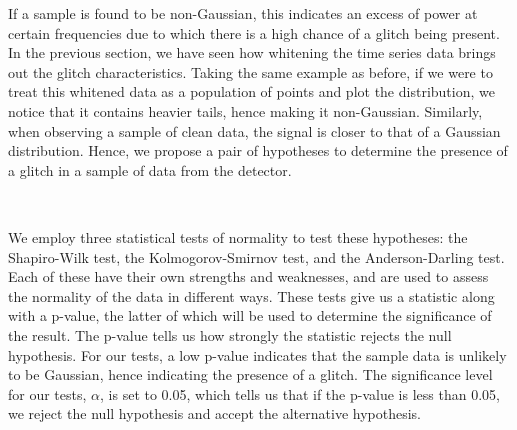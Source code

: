 \documentclass[12pt]{article}
\begin{document}
\medskip
\noindent If a sample is found to be non-Gaussian, this indicates an excess of power at certain frequencies due to which there is a high chance of a glitch being present. In the previous section, we have seen how whitening the time series data brings out the glitch characteristics. Taking the same example as before, if we were to treat this whitened data as a population of points and plot the distribution, we notice that it contains heavier tails, hence making it non-Gaussian. Similarly, when observing a sample of clean data, the signal is closer to that of a Gaussian distribution. Hence, we propose a pair of hypotheses to determine the presence of a glitch in a sample of data from the detector.


\medskip
\noindent{}
\\
\noindent{}

\medskip
\noindent We employ three statistical tests of normality to test these hypotheses: the Shapiro-Wilk test, the Kolmogorov-Smirnov test, and the Anderson-Darling test. Each of these have their own strengths and weaknesses, and are used to assess the normality of the data in different ways. These tests give us a statistic along with a p-value, the latter of which will be used to determine the significance of the result. The p-value tells us how strongly the statistic rejects the null hypothesis. For our tests, a low p-value indicates that the sample data is unlikely to be Gaussian, hence indicating the presence of a glitch. The significance level for our tests, $\alpha$, is set to 0.05, which tells us that if the p-value is less than 0.05, we reject the null hypothesis and accept the alternative hypothesis.
\end{document}
